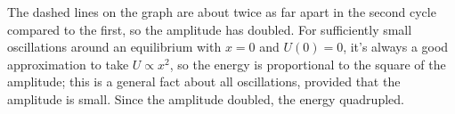 The dashed lines on the graph are about twice as far apart in the
second cycle compared to the first, so the amplitude has doubled. For
sufficiently small oscillations around an equilibrium with $x=0$ and
$U(0)=0$, it's always a good approximation to take $U\propto x^2$, so
the energy is proportional to the square of the amplitude; this is a
general fact about all oscillations, provided that the amplitude is
small. Since the amplitude doubled, the energy quadrupled.
